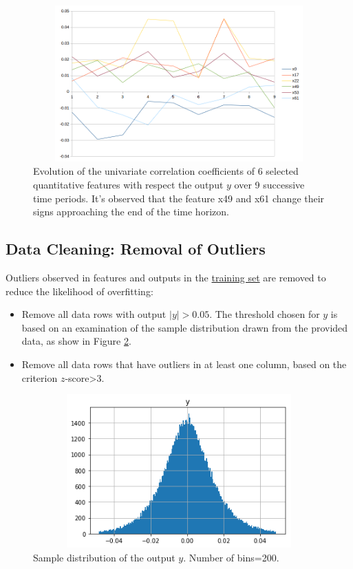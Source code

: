 \documentclass[
11pt, %
a4paper, %
oneside, %
headinclude,footinclude, %
BCOR5mm, %
]{scrartcl}
\begin{document}
\begin{figure}[ht!]
\centering
\includegraphics[width=12.4cm, height=6cm]{corr} 
\caption{Evolution of the univariate correlation coefficients of 6 selected quantitative features with respect the output $y$ over 9 successive time periods. It's observed that the feature x49 and x61 change their signs approaching the end of the time horizon.}\label{corr}
\end{figure}


\subsection{Data Cleaning: Removal of Outliers}\label{outlier}
Outliers observed in features and outputs in the \underline{training set} are removed to reduce the likelihood of overfitting:
\begin{itemize}[noitemsep]
\item Remove all data rows with output $|y|>0.05$. The threshold chosen for $y$ is based on an examination of the sample distribution drawn from the provided data, as show in Figure \ref{hist}.
\item Remove all data rows that have outliers in at least one column, based on the criterion $z$-score>3.
\end{itemize}
\begin{figure}[ht!]
\centering
\includegraphics[width=12cm, height=5.9cm]{hist} 
\caption{Sample distribution of the output $y$. Number of bins=200.}\label{hist}
\end{figure}
 
\end{document}
